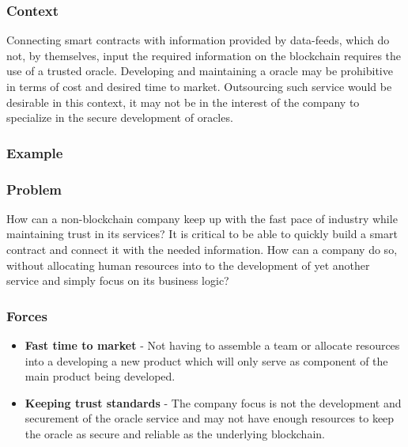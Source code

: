 \subsubsection{Context}
Connecting smart contracts with information provided by data-feeds, which do not, by themselves, input the required information on the blockchain requires the use of a trusted oracle. Developing and maintaining a oracle may be prohibitive in terms of cost and desired time to market. Outsourcing such service would be desirable in this context, it may not be in the interest of the company to specialize in the secure development of oracles.

\subsubsection{Example}



\subsubsection{Problem}
How can a non-blockchain company keep up with the fast pace of industry while maintaining trust in its services? It is critical to be able to quickly build a smart contract and connect it with the needed information. How can a company do so, without allocating human resources into to the development of yet another service and simply focus on its business logic?

\subsubsection{Forces}

\begin{itemize}
  \item \textbf{Fast time to market} - Not having to assemble a team or allocate resources into a developing a new product which will only serve as component of the main product being developed.
  \item \textbf{Keeping trust standards} - The company focus is not the development and securement of the oracle service and may not have enough resources to keep the oracle as secure and reliable as the underlying blockchain.
\end{itemize}


